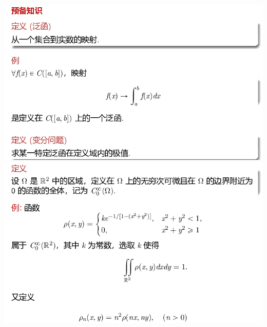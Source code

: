 \documentclass[11pt,a4paper]{ctexart}
\begin{document}
\begin{paracol}{2}
\includegraphics[width=\linewidth]{chap01_46.png}
\includegraphics[width=\linewidth]{chap01_47.png}
\newpage


\end{paracol}
\end{document}
